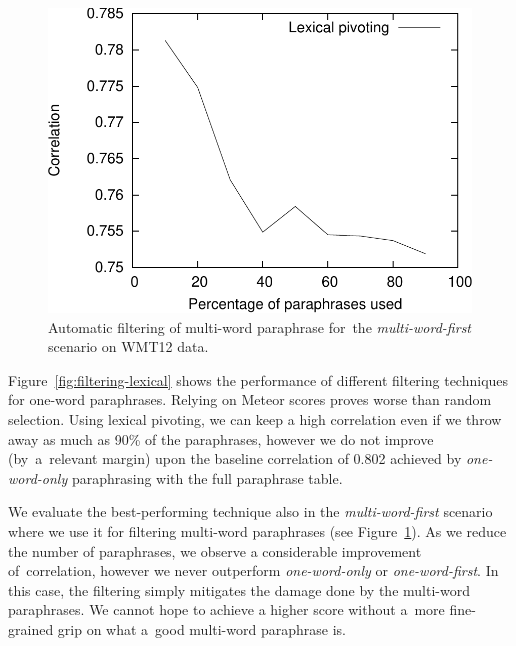 \documentclass[11pt]{article}
\def\Fref#1{Figure~\ref{#1}}
\begin{document}
\begin{figure}[ht]
\begin{center}
\includegraphics[scale=0.55]{filtering-mwe-cropped.pdf}
\caption{Automatic filtering of multi-word paraphrase for~the 
\textit{multi-word-first} scenario on WMT12 data.}
\label{fig:filtering-mwe}
\end{center}
\end{figure}


\Fref{fig:filtering-lexical} shows the performance of different filtering
techniques for one-word paraphrases. Relying on Meteor scores proves worse than
random selection. Using lexical pivoting, we can keep a high correlation even 
if we throw away as much as 90\% of the paraphrases, however we do not improve 
(by~a~relevant margin) upon the baseline correlation of 0.802 achieved by
\emph{one-word-only} paraphrasing with the full paraphrase table.

We evaluate the best-performing technique also in the \textit{multi-word-first}
scenario where we use it for filtering multi-word paraphrases (see
\Fref{fig:filtering-mwe}). As we reduce the number of paraphrases, we observe a
considerable improvement of~correlation, however we never outperform
\textit{one-word-only} or \textit{one-word-first}. In this case, the filtering
simply mitigates the damage done by the multi-word paraphrases. We
cannot hope to achieve a higher score without a~more fine-grained grip on what
a~good multi-word paraphrase is.
\end{document}

